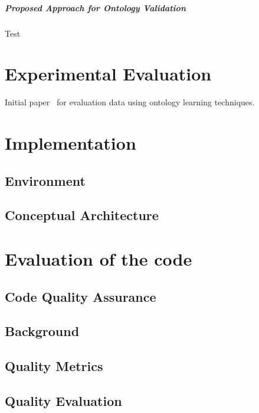 \documentclass[draft,final]{vutinfth} %
\begin{document}


\paragraph{Proposed Approach for Ontology Validation} Test



\chapter{Experimental Evaluation}
Initial paper~\cite{liu2005semi} for evaluation data using ontology learning techniques.


\chapter{Implementation}\label{chap:implementation}
\section{Environment}
\section{Conceptual Architecture}




\chapter{Evaluation of the code}
\section{Code Quality Assurance}
\section{Background}
\section{Quality Metrics}
\section{Quality Evaluation}
\end{document}
